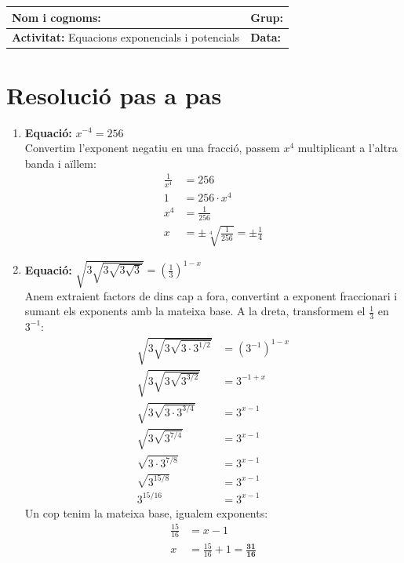 \documentclass[12pt,a4paper]{article}
\begin{document}
\begingroup
\renewcommand{\arraystretch}{2.2}
\begin{tabularx}{\textwidth}{|X|p{4cm}|}
    \hline
    \textbf{Nom i cognoms:} & \textbf{Grup:} \\ \hline
    \textbf{Activitat:} Equacions exponencials i potencials & \textbf{Data:} \\ \hline
\end{tabularx}
\endgroup

\vspace{0.8cm}

\section*{Resolució pas a pas}

\begin{enumerate}[label=\textbf{\alph*)}, leftmargin=*, itemsep=1cm]

    \item \textbf{Equació:} $x^{-4} = 256$ \\
    Convertim l'exponent negatiu en una fracció, passem $x^4$ multiplicant a l'altra banda i aïllem:
    \begin{align*}
        \frac{1}{x^4} &= 256 \\
        1 &= 256 \cdot x^4 \\
        x^4 &= \frac{1}{256} \\
        x &= \pm \sqrt[4]{\frac{1}{256}} = \pm \frac{1}{4}
    \end{align*}

    \item \textbf{Equació:} $\sqrt{3\sqrt{3\sqrt{3\sqrt{3}}}} = \left(\frac{1}{3}\right)^{1-x}$ \\
    Anem extraient factors de dins cap a fora, convertint a exponent fraccionari i sumant els exponents amb la mateixa base. A la dreta, transformem el $\frac{1}{3}$ en $3^{-1}$:
    \begin{align*}
        \sqrt{3\sqrt{3\sqrt{3 \cdot 3^{1/2}}}} &= (3^{-1})^{1-x} \\
        \sqrt{3\sqrt{3\sqrt{3^{3/2}}}} &= 3^{-1+x} \\
        \sqrt{3\sqrt{3 \cdot 3^{3/4}}} &= 3^{x-1} \\
        \sqrt{3\sqrt{3^{7/4}}} &= 3^{x-1} \\
        \sqrt{3 \cdot 3^{7/8}} &= 3^{x-1} \\
        \sqrt{3^{15/8}} &= 3^{x-1} \\
        3^{15/16} &= 3^{x-1}
    \end{align*}
    Un cop tenim la mateixa base, igualem exponents:
    \begin{align*}
        \frac{15}{16} &= x - 1 \\
        x &= \frac{15}{16} + 1 = \mathbf{\frac{31}{16}}
    \end{align*}


\end{enumerate}
\end{document}
